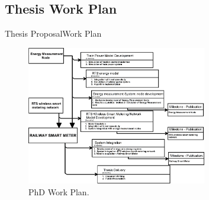 \subsection{Thesis Work Plan}

\begin{frame}{Thesis Proposal}{Work Plan}
\begin{figure}[ht!]
	\centering
	\includegraphics[width=0.7\textwidth,keepaspectratio]{figures/40.Method/workplan0}
	\caption{PhD Work Plan.}
\end{figure}
\end{frame}
